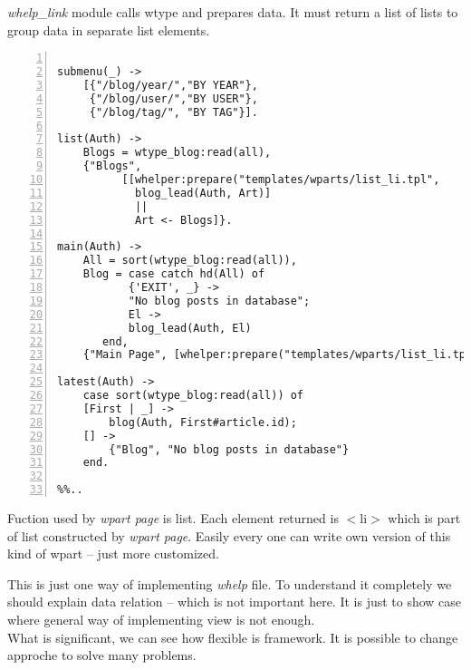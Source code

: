 \emph{whelp\_link} module calls wtype and prepares data. It must return a list of
lists to group data in separate list elements.

\begin{Verbatim}[frame=single,
       framesep=2mm, numbers=left,
       label=whelp\_link.erl,labelposition=topline,
       fontsize=\footnotesize]
%% .. 

submenu(_) ->
    [{"/blog/year/","BY YEAR"},
     {"/blog/user/","BY USER"},
     {"/blog/tag/", "BY TAG"}]. 

list(Auth) ->
    Blogs = wtype_blog:read(all),
    {"Blogs", 
          [[whelper:prepare("templates/wparts/list_li.tpl",
            blog_lead(Auth, Art)] 
            || 
            Art <- Blogs]}.

main(Auth) ->
    All = sort(wtype_blog:read(all)),
    Blog = case catch hd(All) of
	       {'EXIT', _} -> 
		   "No blog posts in database";
	       El -> 
		   blog_lead(Auth, El)
	   end,
    {"Main Page", [whelper:prepare("templates/wparts/list_li.tpl",Blog)]}.

latest(Auth) ->
    case sort(wtype_blog:read(all)) of
	[First | _] ->
	    blog(Auth, First#article.id);
	[] ->
	    {"Blog", "No blog posts in database"}
    end.

%%..
\end{Verbatim}
Fuction used by \emph{wpart page} is list. Each element returned is $<$li$>$
which is part of list constructed by \emph{wpart page}. Easily every one can
write own version of this kind of wpart -- just more customized.  

This is just one way of implementing \emph{whelp} file. To understand it
completely we should explain data relation -- which is not important here. It is
just to show case where general way of implementing view is not enough. 
\\
What is significant, we can see how flexible is framework. It is possible to
change approche	to solve many problems.   


